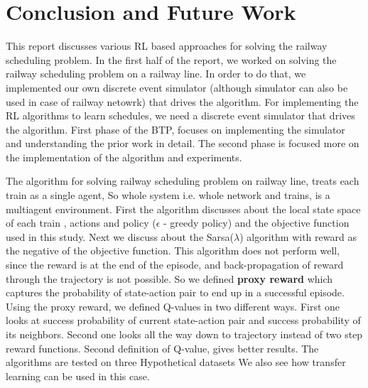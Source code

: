 \chapter{Conclusion and Future Work}

This report discusses various RL based approaches for solving the railway scheduling problem.
In the first half of the report, we worked on solving the railway scheduling problem on a 
railway line. In order to do that, we implemented our own discrete event simulator (although simulator can also be used in case of 
railway netowrk) that drives the algorithm.
For implementing the RL algorithms to learn schedules, we need a discrete event simulator 
that drives the algorithm. First phase of the BTP, focuses on implementing the simulator and 
understanding the prior work in detail. The second phase is focused more on the implementation of the 
algorithm and experiments. 

\vspace{\baselineskip}
The algorithm for solving railway scheduling problem on railway line,
 treats each train as a single agent, So whole system i.e. 
whole network and trains, is a multiagent environment. First the algorithm discusses about the 
local state space of each train , actions and policy ($\epsilon$ - greedy policy) and the objective
function used in this study. Next we discuss about the Sarsa($\lambda$) algorithm with reward as the negative 
of the objective function. This algorithm does not perform well, since the reward is at the end of the episode, 
and back-propagation of reward through the trajectory is not possible. So we defined \textbf{proxy reward} which 
captures the probability of state-action pair to end up in a successful episode. Using the proxy reward,
we defined Q-values in two different ways. First one looks at success probability of current state-action pair 
and success probability of its neighbors. Second one looks all the way down to trajectory instead of 
two step reward functions. Second definition of Q-value, gives better results. The algorithms are tested on three Hypothetical datasets
We also see how transfer learning can be used in this case.



